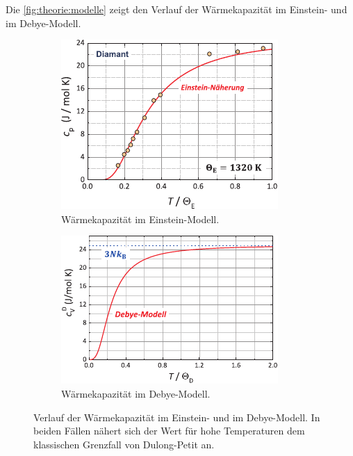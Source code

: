     Die \autoref{fig:theorie:modelle} zeigt den Verlauf der Wärmekapazität im Einstein- und im Debye-Modell.
    \begin{figure}
        \centering
        \begin{subfigure}{0.48\textwidth}
            \centering
            \includegraphics[height=0.75\textwidth]{content/img/Gross_Marx/6_5.pdf}
            \caption{Wärmekapazität im Einstein-Modell.}
            \label{fig:theorie:einsteinmodell}
        \end{subfigure}
        \hfill
        \begin{subfigure}{0.48\textwidth}
            \centering
            \includegraphics[height=0.75\textwidth]{content/img/Gross_Marx/6_7.pdf}
            \caption{Wärmekapazität im Debye-Modell.}
            \label{fig:theorie:debyemodell}
        \end{subfigure}
        \caption{Verlauf der Wärmekapazität im Einstein- und im Debye-Modell.
        In beiden Fällen nähert sich der Wert für hohe Temperaturen dem klassischen Grenzfall von Dulong-Petit an. \cite{grossmarx}}
        \label{fig:theorie:modelle}
    \end{figure}

